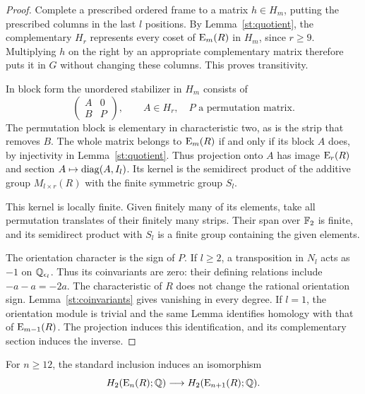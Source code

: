\begin{proof}
Complete a prescribed ordered frame to a matrix $h\in H_m$, putting
the prescribed columns in the last $l$ positions. By
Lemma~\ref{st:quotient}, the complementary $H_r$ represents every
coset of $\operatorname{E}_m(R)$ in $H_m$, since $r\geq9$. Multiplying $h$ on
the right by an appropriate complementary matrix therefore puts it
in $G$ without changing these columns. This proves transitivity.

In block form the unordered stabilizer in $H_m$ consists of
\[
 \begin{pmatrix}A&0\\B&P\end{pmatrix},
 \qquad A\in H_r,\quad P\text{ a permutation matrix}.
\]
The permutation block is elementary in characteristic two, as is
the strip that removes $B$. The whole matrix belongs to $\operatorname{E}_m(R)$
if and only if its block $A$ does, by injectivity in
Lemma~\ref{st:quotient}. Thus projection onto $A$ has image
$\operatorname{E}_r(R)$ and section $A\mapsto\operatorname{diag}(A,I_l)$.
Its kernel is the semidirect product of the additive group
$M_{l\times r}(R)$ with the finite symmetric group $S_l$.

This kernel is locally finite. Given finitely many of its elements,
take all permutation translates of their finitely many strips.
Their span over $\mathbb F_2$ is finite, and its semidirect product with
$S_l$ is a finite group containing the given elements.

The orientation character is the sign of $P$. If $l\geq2$, a
transposition in $N_l$ acts as $-1$ on $\mathbb Q_{\epsilon_l}$. Thus
its coinvariants are zero: their defining relations include
$-a-a=-2a$. The characteristic of $R$ does not change the rational
orientation sign. Lemma~\ref{st:coinvariants} gives vanishing in
every degree. If $l=1$, the orientation module is trivial and the
same Lemma identifies homology with that of $\operatorname{E}_{m-1}(R)$. The
projection induces this identification, and its complementary
section induces the inverse.
\end{proof}

\begin{proposition}\label{st:h2}
For $n\geq12$, the standard inclusion induces an isomorphism
\[
 H_2(\operatorname{E}_n(R);\mathbb Q)\longrightarrow
 H_2(\operatorname{E}_{n+1}(R);\mathbb Q).
\]
\end{proposition}

